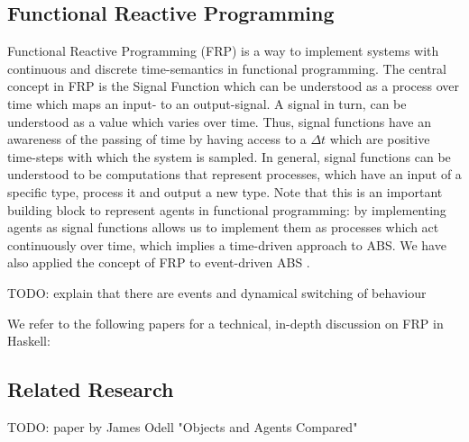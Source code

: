 \subsection{Functional Reactive Programming}
Functional Reactive Programming (FRP) is a way to implement systems with continuous and discrete time-semantics in functional programming. The central concept in FRP is the Signal Function which can be understood as a process over time which maps an input- to an output-signal. A signal in turn, can be understood as a value
which varies over time. Thus, signal functions have an awareness of the passing of time by having access to a $\Delta t$ which are positive time-steps with which the system is sampled. In general, signal functions can be understood to be computations that represent processes, which have an input of a specific type, process it and output a new type. Note that this is an important building block to represent agents in functional programming: by implementing agents as signal functions allows us to implement them as processes which act continuously over time, which implies a time-driven approach to ABS. We have also applied the concept of FRP to event-driven ABS \citep{meyer_event-driven_2014}.

TODO: explain that there are events and dynamical switching of behaviour

We refer to the following papers for a technical, in-depth discussion on FRP in Haskell: \citep{wan_functional_2000, hughes_generalising_2000, hughes_programming_2005, hudak_arrows_2003, courtney_yampa_2003, nilsson_functional_2002, perez_functional_2016, perez_extensible_2017}

\subsection{Related Research}
TODO: paper by James Odell "Objects and Agents Compared"
